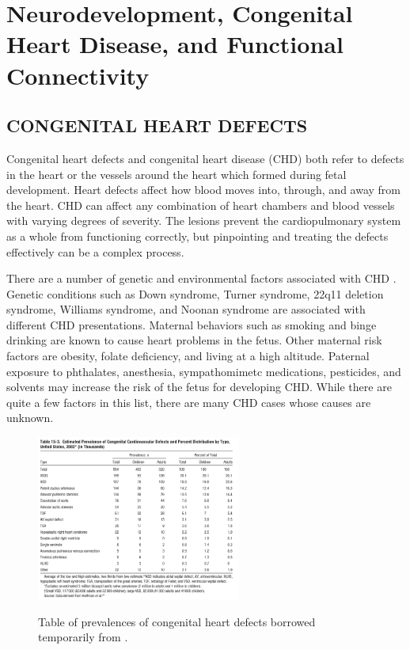 \chapter{Neurodevelopment, Congenital Heart Disease, and Functional Connectivity}
\label{ch:clinical}

\section{CONGENITAL HEART DEFECTS}

Congenital heart defects and congenital heart disease (CHD) both refer to defects in the heart or the vessels around the heart which formed during  fetal development. Heart defects affect how blood moves into, through, and away from the heart. 
CHD can affect any combination of heart chambers and blood vessels with varying degrees of severity. The lesions prevent the cardiopulmonary system as a whole from functioning correctly, but pinpointing and treating the defects effectively can be a complex process.
 
There are a number of genetic and environmental factors associated with CHD \cite{Mozaffarian2016}. Genetic conditions such as Down syndrome, Turner syndrome, 22q11 deletion syndrome, Williams syndrome, and Noonan syndrome are associated with different CHD presentations. Maternal behaviors such as smoking and binge drinking are known to cause heart problems in the fetus. Other maternal risk factors are obesity, folate deficiency, and living at a high altitude. Paternal exposure to phthalates, anesthesia, sympathomimetc medications, pesticides, and solvents may increase the risk of the fetus for developing CHD. While there are quite a few factors in this list, there are many CHD cases whose causes are unknown.

\begin{figure}
\centering
\includegraphics[width=0.6\textwidth]{2/chd-defects-usa.png}
\label{ch2:fig:usa-defects-prev}
\caption{Table of prevalences of congenital heart defects borrowed temporarily from \cite{Mozaffarian2016}.}
\end{figure}

